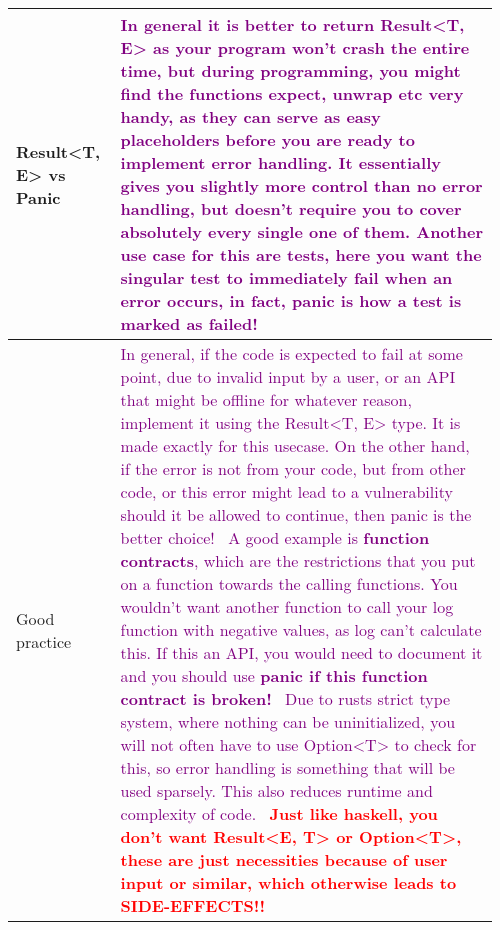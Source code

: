 \documentclass[main.tex,fontsize=8pt,paper=a4,paper=portrait,DIV=calc,]{scrartcl}
\begin{document}
\begin{table}[ht!]
\begin{tabular}{|m{0.2\linewidth}|m{0.755\linewidth}|}
\hline
Result<T, E> vs Panic & 
\textcolor{purple}{In general it is better to return Result<T, E> as your program won't crash the entire time, but during programming, you might find the functions expect, unwrap etc very handy, as they can serve as easy placeholders before you are ready to implement error handling. It essentially gives you slightly more control than no error handling, but doesn't require you to cover absolutely every single one of them.\newline
Another use case for this are tests, here you want the singular test to immediately fail when an error occurs, in fact, \textbf{panic is how a test is marked as failed!}}\\
\hline
Good practice & 
\textcolor{Purple}{In general, if the code is expected to fail at some point, due to invalid input by a user, or an API that might be offline for whatever reason, implement it using the Result<T, E> type. It is made exactly for this usecase.\newline
On the other hand, if the error is not from your code, but from other code, or this error might lead to a vulnerability should it be allowed to continue, then panic is the better choice!\newline
\, \newline
A good example is \textbf{function contracts}, which are the restrictions that you put on a function towards the calling functions. You wouldn't want another function to call your log function with negative values, as log can't calculate this. If this an API, you would need to document it and you should use \textbf{panic if this function contract is broken!}\newline
\, \newline
Due to rusts strict type system, where nothing can be uninitialized, you will not often have to use Option<T> to check for this, so error handling is something that will be used sparsely.\newline
This also reduces runtime and complexity of code.}\newline
\, \newline
\textcolor{Red}{\textbf{Just like haskell, you don't want Result<E, T> or Option<T>, these are just necessities because of user input or similar, which otherwise leads to SIDE-EFFECTS!!}}\\
\hline

\hline

\hline

\hline

\hline

\hline

\hline
\end{tabular}
\end{table}
\end{document}
